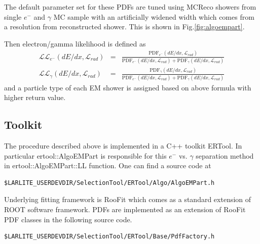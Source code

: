 The default parameter set for these PDFs are tuned using MCReco showers from single $e^{-}$ and $\gamma$
MC sample with an artificially widened width which comes from a resolution from reconstructed shower.
This is shown in Fig.\ref{fig:algoempart}.

Then electron/gamma likelihood is defined as
\begin{eqnarray}
  \mathcal{LL}_{e^-}\left(dE/dx,\mathcal{L}_{rad}\right) &=& \frac{\text{PDF}_{e^-}(dE/dx,\mathcal{L}_{rad})}{\text{PDF}_{e^-}(dE/dx,\mathcal{L}_{rad}) + \text{PDF}_{\gamma}(dE/dx,\mathcal{L}_{rad})}\\
    \mathcal{LL}_{\gamma}\left(dE/dx,\mathcal{L}_{rad}\right) &=& \frac{\text{PDF}_{\gamma}(dE/dx,\mathcal{L}_{rad})}{\text{PDF}_{e^-}(dE/dx,\mathcal{L}_{rad}) + \text{PDF}_{\gamma}(dE/dx,\mathcal{L}_{rad})}
\end{eqnarray}
and a particle type of each EM shower is assigned based on above formula with higher return value.

\subsection{Toolkit}
The procedure described above is implemented in a {\ttfamily C++} toolkit {\ttfamily ERTool}.
In particular {\ttfamily ertool::AlgoEMPart} is responsible for this $e^-$ vs. $\gamma$ separation
method in {\ttfamily ertool::AlgoEMPart::LL} function. One can find a source code at
\begin{lstlisting}
$LARLITE_USERDEVDIR/SelectionTool/ERTool/Algo/AlgoEMPart.h
\end{lstlisting}
Underlying fitting framework is {\ttfamily RooFit} which comes as a standard extension of {\ttfamily ROOT}
software framework. PDFs are implemented as an extension of {\ttfamily RooFit} PDF classes in the following
source code.
\begin{lstlisting}
$LARLITE_USERDEVDIR/SelectionTool/ERTool/Base/PdfFactory.h
\end{lstlisting}
